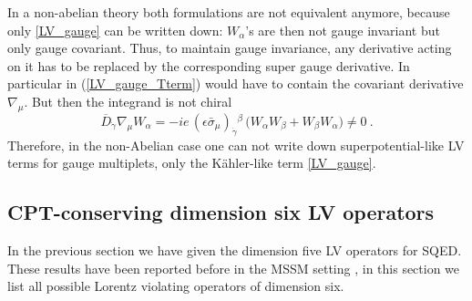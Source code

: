 \documentclass[12pt]{revtex4}
\begin{document}
In a non-abelian theory both formulations are not
equivalent anymore, because only \eqref{LV_gauge} can be written down: 
$W_\alpha$'s are then not gauge invariant but only gauge covariant.
Thus, to maintain gauge invariance, any derivative acting on it has to
be replaced by the corresponding super gauge derivative. In particular
in (\ref{LV_gauge_Tterm}) would have to contain the covariant
derivative $\nabla_\mu$.  But then the integrand is not chiral 
\begin{equation}
\overline{D}_{\dot\gamma} \nabla_\mu W_\alpha = 
-i e\, (\epsilon \bar\sigma_\mu)_{\dot\gamma}{}^\beta\, 
\Big( W_\alpha W_\beta + W_\beta W_\alpha \Big) \neq 0~. 
\end{equation} 
Therefore, in the non-Abelian case one can not write down
superpotential-like LV terms for gauge multiplets, only 
the K\"ahler-like term \eqref{LV_gauge}. 


\subsection{CPT-conserving dimension six LV operators}
\label{Dim6}


In the previous section we have given the dimension five LV operators
for SQED. These results have been reported before in the MSSM 
setting \cite{GrootNibbelink:2004za}, in this section we list all
possible Lorentz violating operators of dimension six. 
\end{document}
